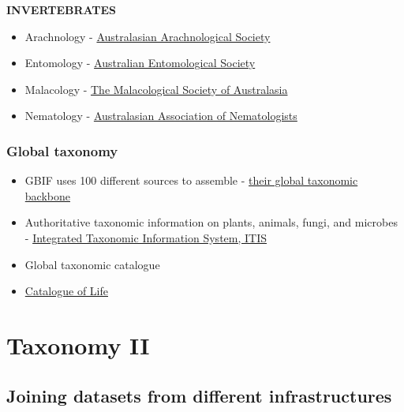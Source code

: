 \documentclass[
  letterpaper,
  DIV=11,
  numbers=noendperiod,
  oneside]{scrreprt}
\providecommand{\tightlist}{%
  \setlength{\itemsep}{0pt}\setlength{\parskip}{0pt}}\usepackage{longtable,booktabs,array}
\begin{document}
\textbf{INVERTEBRATES}

\begin{itemize}
\tightlist
\item
  Arachnology -
  \href{www.australasianarachnologicalsociety.org}{Australasian
  Arachnological Society}\\
\item
  Entomology - \href{https://www.austentsoc.org.au/}{Australian
  Entomological Society}\\
\item
  Malacology - \href{https://www.malsocaus.org/}{The Malacological
  Society of Australasia}\\
\item
  Nematology - \href{https://www.nematologists.org.au/}{Australasian
  Association of Nematologists}
\end{itemize}

\hypertarget{global-taxonomy}{%
\subsection{Global taxonomy}\label{global-taxonomy}}

\begin{itemize}
\item
  GBIF uses 100 different sources to assemble -
  \href{https://www.gbif.org/dataset/d7dddbf4-2cf0-4f39-9b2a-bb099caae36c}{their
  global taxonomic backbone}
\item
  Authoritative taxonomic information on plants, animals, fungi, and
  microbes - \href{https://www.itis.gov/}{Integrated Taxonomic
  Information System, ITIS}
\item
  Global taxonomic catalogue
\item
  \href{https://www.catalogueoflife.org/}{Catalogue of Life}
\end{itemize}


\hypertarget{taxonomy-ii}{%
\chapter{Taxonomy II}\label{taxonomy-ii}}

\hypertarget{joining-datasets-from-different-infrastructures}{%
\section{Joining datasets from different
infrastructures}\label{joining-datasets-from-different-infrastructures}}
\end{document}
